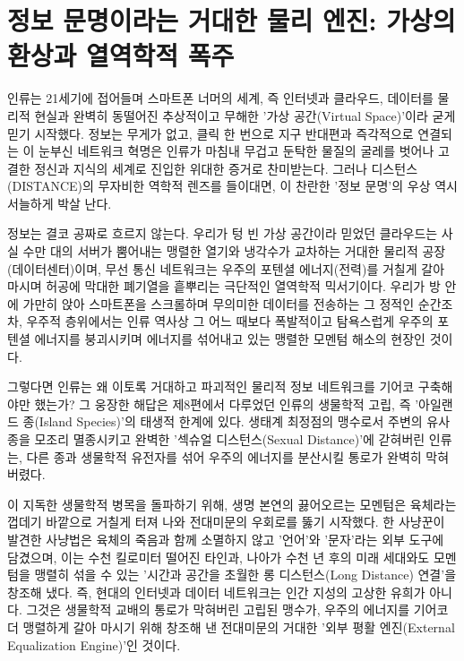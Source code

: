 
\section{정보 문명이라는 거대한 물리 엔진: 가상의 환상과 열역학적 폭주}
인류는 21세기에 접어들며 스마트폰 너머의 세계, 즉 인터넷과 클라우드, 데이터를 물리적 현실과 완벽히 동떨어진 추상적이고 무해한 '가상 공간(Virtual Space)'이라 굳게 믿기 시작했다. 정보는 무게가 없고, 클릭 한 번으로 지구 반대편과 즉각적으로 연결되는 이 눈부신 네트워크 혁명은 인류가 마침내 무겁고 둔탁한 물질의 굴레를 벗어나 고결한 정신과 지식의 세계로 진입한 위대한 증거로 찬미받는다.
그러나 디스턴스(DISTANCE)의 무자비한 역학적 렌즈를 들이대면, 이 찬란한 '정보 문명'의 우상 역시 서늘하게 박살 난다.

정보는 결코 공짜로 흐르지 않는다. 우리가 텅 빈 가상 공간이라 믿었던 클라우드는 사실 수만 대의 서버가 뿜어내는 맹렬한 열기와 냉각수가 교차하는 거대한 물리적 공장(데이터센터)이며, 무선 통신 네트워크는 우주의 포텐셜 에너지(전력)를 거칠게 갈아 마시며 허공에 막대한 폐기열을 흩뿌리는 극단적인 열역학적 믹서기이다. 우리가 방 안에 가만히 앉아 스마트폰을 스크롤하며 무의미한 데이터를 전송하는 그 정적인 순간조차, 우주적 층위에서는 인류 역사상 그 어느 때보다 폭발적이고 탐욕스럽게 우주의 포텐셜 에너지를 붕괴시키며 에너지를 섞어내고 있는 맹렬한 모멘텀 해소의 현장인 것이다.

그렇다면 인류는 왜 이토록 거대하고 파괴적인 물리적 정보 네트워크를 기어코 구축해야만 했는가? 그 웅장한 해답은 제8편에서 다루었던 인류의 생물학적 고립, 즉 '아일랜드 종(Island Species)'의 태생적 한계에 있다. 생태계 최정점의 맹수로서 주변의 유사종을 모조리 멸종시키고 완벽한 '섹슈얼 디스턴스(Sexual Distance)'에 갇혀버린 인류는, 다른 종과 생물학적 유전자를 섞어 우주의 에너지를 분산시킬 통로가 완벽히 막혀버렸다.

이 지독한 생물학적 병목을 돌파하기 위해, 생명 본연의 끓어오르는 모멘텀은 육체라는 껍데기 바깥으로 거칠게 터져 나와 전대미문의 우회로를 뚫기 시작했다. 한 사냥꾼이 발견한 사냥법은 육체의 죽음과 함께 소멸하지 않고 '언어'와 '문자'라는 외부 도구에 담겼으며, 이는 수천 킬로미터 떨어진 타인과, 나아가 수천 년 후의 미래 세대와도 모멘텀을 맹렬히 섞을 수 있는 '시간과 공간을 초월한 롱 디스턴스(Long Distance) 연결'을 창조해 냈다. 즉, 현대의 인터넷과 데이터 네트워크는 인간 지성의 고상한 유희가 아니다. 그것은 생물학적 교배의 통로가 막혀버린 고립된 맹수가, 우주의 에너지를 기어코 더 맹렬하게 갈아 마시기 위해 창조해 낸 전대미문의 거대한 '외부 평활 엔진(External Equalization Engine)'인 것이다.

